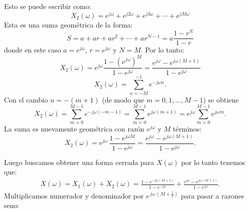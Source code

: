 \documentclass[
  11pt,
  letterpaper,
   addpoints,
   answers
  ]{exam}
\begin{document}
\begin{questions}
\begin{solution}
\[\]
Esto se puede escribir como:
\[
X_2(\omega) = e^{j\omega} + e^{j2\omega} + e^{j3\omega} + \cdots + e^{jM\omega}
\]
Esta es una suma geométrica de la forma:
\[
S = a + ar + ar^2 + \cdots + ar^{N-1} = a \frac{1 - r^{N}}{1 - r}
\]
donde en este caso $a = e^{j\omega}$, $r = e^{j\omega}$ y $N = M$. Por lo tanto:
\[
X_2(\omega) = e^{j\omega} \frac{1 - (e^{j\omega})^{M}}{1 - e^{j\omega}} = \frac{e^{j\omega} - e^{j\omega(M+1)}}{1 - e^{j\omega}}
\]
\[
X_2(\omega)=\sum_{n=-M}^{-1}e^{-j\omega n}.
\]
Con el cambio $n=-(m+1)$ (de modo que $m=0,1,\dots,M-1$) se obtiene
\[
X_2(\omega)=\sum_{m=0}^{M-1}e^{-j\omega(-m-1)}
=\sum_{m=0}^{M-1}e^{j\omega(m+1)}
= e^{j\omega}\sum_{m=0}^{M-1}e^{j\omega m}.
\]
La suma es nuevamente geométrica con razón $e^{j\omega}$ y $M$ términos:
\[
\boxed{~
X_2(\omega)
= e^{j\omega}\,\frac{1-e^{j\omega M}}{1-e^{j\omega}}
= \frac{e^{j\omega}-e^{j\omega(M+1)}}{1-e^{j\omega}}. ~}
\]

Luego buscamos obtener una forma cerrada para $X(\omega)$ por lo tanto tenemos que:
\begin{align}
X(\omega)=X_1(\omega)+X_2(\omega) = \frac{1-e^{-j\omega(M+1)}}{1-e^{-j\omega}} + \frac{e^{j\omega}-e^{j\omega(M+1)}}{1-e^{j\omega}}.
\end{align}
Multiplicamos numerador y denominador por $e^{\,j\omega\,(M+\tfrac12)}$ para pasar a razones seno:


\end{solution}
\end{questions}
\end{document}
